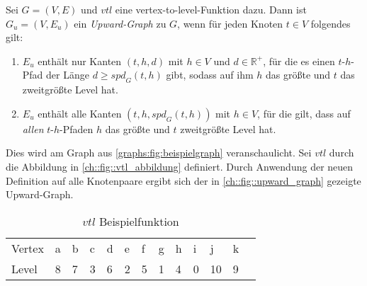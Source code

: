 \begin{definition}\label{people:def:upward_graph}
  Sei $G = (V, E)$ und ${vtl}$ eine vertex-to-level-Funktion dazu.
  Dann ist $G_u = (V, E_u)$ ein \emph{Upward-Graph} zu $G$, wenn für jeden Knoten $t \in V$ folgendes gilt:

  \begin{enumerate}
    \item
          $E_u$ enthält nur Kanten $(t, h, d)$ mit $h \in V$ und $d \in \mathbb{R}^+$, für die es einen $t$-$h$-Pfad der Länge $d \geq {spd}_G (t, h)$ gibt, sodass auf ihm $h$ das größte und $t$ das zweitgrößte Level hat.

    \item
          $E_u$ enthält alle Kanten $(t, h, {spd}_G (t, h))$ mit $h \in V$, für die gilt, dass auf \emph{allen} $t$-$h$-Pfaden $h$ das größte und $t$ zweitgrößte Level hat.
  \end{enumerate}
\end{definition}

Dies wird am Graph aus \autoref{graphs:fig:beispielgraph} veranschaulicht.
Sei ${vtl}$ durch die Abbildung in \autoref{ch::fig::vtl_abbildung} definiert.
Durch Anwendung der neuen Definition auf alle Knotenpaare ergibt sich der in \autoref{ch::fig::upward_graph} gezeigte Upward-Graph.

\begin{table}[ht]
  \centering
  \begin{tabular}{lllllllllllll}
    Vertex & a & b & c & d & e & f & g & h & i & j  & k & \\
    Level  & 8 & 7 & 3 & 6 & 2 & 5 & 1 & 4 & 0 & 10 & 9 &
  \end{tabular}
  \caption{${vtl}$ Beispielfunktion}
  \label{ch::fig::vtl_abbildung}
\end{table}

